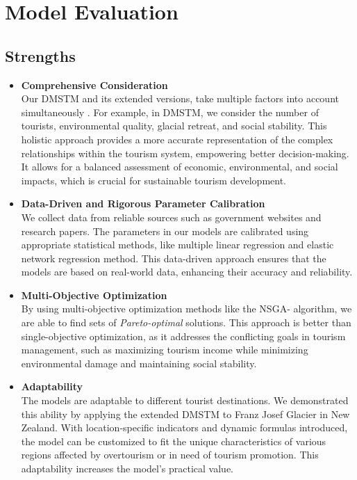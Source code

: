 \documentclass{mcmthesis}
\begin{document}
\section{Model Evaluation}
\subsection{Strengths}
\begin{itemize}
 \item \textbf{Comprehensive Consideration} \\
 Our DMSTM and its extended versions, take multiple factors into account simultaneously . 
 For example, in DMSTM, we consider the number of tourists, environmental quality, glacial retreat, and social stability. 
 This holistic approach provides a more accurate representation of the complex relationships within the tourism system, 
 empowering better decision-making. It allows for a balanced assessment of economic, environmental, and social impacts, 
 which is crucial for sustainable tourism development.
 \item \textbf{Data-Driven and Rigorous Parameter Calibration} \\
 We collect data from reliable sources such as government websites and research papers.
 The parameters in our models are calibrated using appropriate statistical methods, like multiple linear regression and elastic network regression method.
 This data-driven approach ensures that the models are based on real-world data, enhancing their accuracy and reliability.
 \item \textbf{Multi-Objective Optimization} \\
 By using multi-objective optimization methods like the NSGA-\uppercase\expandafter{} algorithm,
 we are able to find sets of \emph{Pareto-optimal} solutions. This approach is better than single-objective optimization, 
 as it addresses the conflicting goals in tourism management, such as maximizing tourism income while minimizing environmental damage and maintaining social stability.
 \item \textbf{Adaptability} \\
 The models are adaptable to different tourist destinations.
 We demonstrated this ability by applying the extended DMSTM to Franz Josef Glacier in New Zealand.
 With location-specific indicators and dynamic formulas introduced, the model can be customized to fit the unique characteristics of various regions affected by overtourism or in need of tourism promotion.
 This adaptability increases the model's practical value.
\end{itemize}
\end{document}
